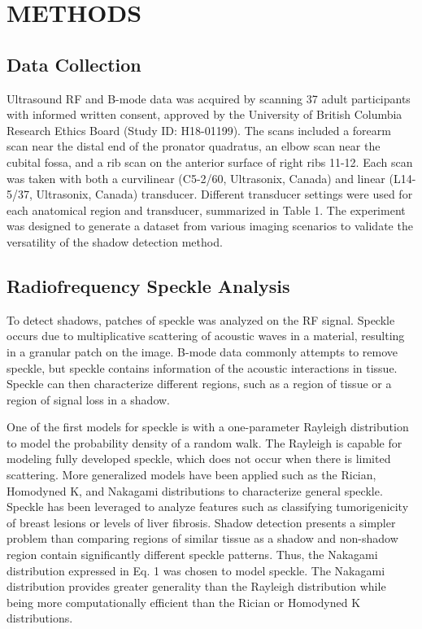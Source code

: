 \documentclass[preprint,5p]{elsarticle}
\begin{document}
\section*{METHODS}
\label{MaM}
     
\subsection*{Data Collection}
Ultrasound RF and B-mode data was acquired by scanning 37 adult participants with informed written consent, approved by the University of British Columbia Research Ethics Board (Study ID: H18-01199). The scans included a forearm scan near the distal end of the pronator quadratus, an elbow scan near the cubital fossa, and a rib scan on the anterior surface of right ribs 11-12. Each scan was taken with both a curvilinear (C5-2/60, Ultrasonix, Canada) and linear (L14-5/37, Ultrasonix, Canada) transducer. Different transducer settings were used for each anatomical region and transducer, summarized in Table 1. The experiment was designed to generate a dataset from various imaging scenarios to validate the versatility of the shadow detection method.

\subsection*{Radiofrequency Speckle Analysis}      
To detect shadows, patches of speckle was analyzed on the RF signal. Speckle occurs due to multiplicative scattering of acoustic waves in a material, resulting in a granular patch on the image. B-mode data commonly attempts to remove speckle, but speckle contains information of the acoustic interactions in tissue. Speckle can then characterize different regions, such as a region of tissue or a region of signal loss in a shadow.

One of the first models for speckle is with a one-parameter Rayleigh distribution to model the probability density of a random walk. The Rayleigh is capable for modeling fully developed speckle, which does not occur when there is limited scattering. More generalized models have been applied such as the Rician, Homodyned K, and Nakagami distributions to characterize general speckle. Speckle has been leveraged to analyze features such as classifying tumorigenicity of breast lesions or levels of liver fibrosis. Shadow detection presents a simpler problem than comparing regions of similar tissue as a shadow and non-shadow region contain significantly different speckle patterns. Thus, the Nakagami distribution expressed in Eq. 1 was chosen to model speckle. The Nakagami distribution provides greater generality than the Rayleigh distribution while being more computationally efficient than the Rician or Homodyned K distributions.
\end{document}

